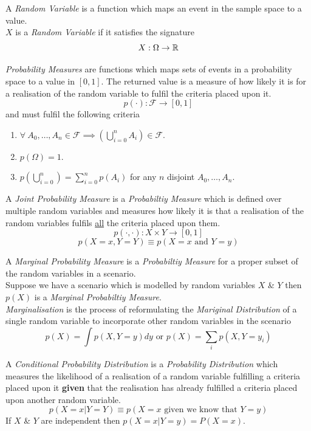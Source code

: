 \documentclass[11pt,a4paper]{article}
\begin{document}
A \textit{Random Variable} is a function which maps an event in the sample space to a value.\\ $X$ is a \textit{Random Variable} if it satisfies the signature
$$X:\Omega\to\mathbb{R}$$

\textit{Probability Measures} are functions which maps sets of events in a probability space to a value in $[0,1]$. The returned value is a measure of how likely it is for a realisation of the random variable to fulfil the criteria placed upon it.
$$p(\cdot):\mathcal{F}\to[0,1]$$
and must fulfil the following criteria
\begin{enumerate}
	\item $\forall\ A_0,\dots,A_n\in\mathcal{F}\implies\left(\bigcup\limits_{i=0}^nA_i\right)\in\mathcal{F}$.
	\item $p(\Omega)=1$.
	\item $p\left(\bigcup\limits_{i=0}^n\right)=\sum\limits_{i=0}^np(A_i)$ for any $n$ disjoint $A_0,\dots,A_n$.
\end{enumerate}

A \textit{Joint Probability Measure} is a \textit{Probabiltiy Measure} which is defined over multiple random variables and measures how likely it is that a realisation of the random variables fulfils \underline{all} the criteria placed upon them.
$$p(\cdot,\cdot):X\times Y\to[0,1]$$
$$p(X=x,Y=Y)\equiv p(X=x\text{ and }Y=y)$$

A \textit{Marginal Probability Measure} is a \textit{Probabiltiy Measure} for a proper subset of the random variables in a scenario.\\
Suppose we have a scenario which is modelled by random variables $X$ \& $Y$ then $p(X)$ is a \textit{Marginal Probabiltiy Measure}.\\
\textit{Marginalisation} is the process of reformulating the \textit{Mariginal Distribution} of a single random variable to incorporate other random variables in the scenario
$$p(X)=\int p(X,Y=y)dy\text{ or }p(X)=\sum_i p(X,Y=y_i)$$

A \textit{Conditional Probability Distribution} is a \textit{Probability Distribution} which measures the likelihood of a realisation of a random variable fulfilling a criteria placed upon it \textbf{given} that the realisation has already fulfilled a criteria placed upon another random variable.
$$p(X=x|Y=Y)\equiv p(X=x\text{ given we know that }Y=y)$$
\nb If $X$ \& $Y$ are independent then $p(X=x|Y=y)=P(X=x)$.\\
\end{document}
